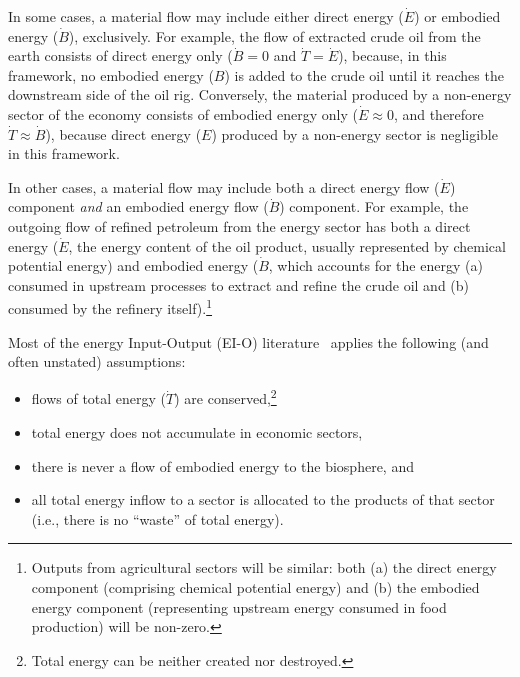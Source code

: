 In some cases, a material flow may include 
either direct energy ($\dot{E}$) 
or embodied energy ($\dot{B}$), exclusively. 
For example, the flow of extracted crude oil from the earth 
consists of direct energy only ($\dot{B} = 0$ and $\dot{T} = \dot{E}$), 
because, in this framework, no embodied energy ($B$) is added 
to the crude oil until it reaches the downstream side of the oil rig.
Conversely, the material produced by a non-energy sector of the economy 
consists of embodied energy only ($\dot{E} \approx 0$, 
and therefore $\dot{T} \approx \dot{B}$), 
because direct energy ($E$) produced by 
a non-energy sector is negligible in this framework. 

In other cases, a material flow may include both a direct energy flow
($\dot{E}$) component \emph{and} an embodied energy flow ($\dot{B}$) component.
For example, the outgoing flow of refined petroleum from the energy sector 
has both a direct energy ($\dot{E}$, the energy content of the oil product, 
usually represented by chemical potential energy) 
and embodied energy ($\dot{B}$, which accounts for the energy 
(a) consumed in upstream processes 
to extract and refine the crude oil and 
(b) consumed by the refinery itself).\footnote{Outputs from 
	agricultural sectors will be similar: 
	both (a) the direct energy component (comprising chemical potential energy) 
	and (b) the embodied energy component (representing upstream
	energy consumed in food production) will be non-zero.}

Most of the energy Input-Output (EI-O) literature~\cite{Bullard1975, Herendeen1978} 
applies the following (and often unstated) assumptions:

\begin{itemize}
	\item{flows of total energy ($\dot{T}$) are 
	conserved,\footnote{Total energy 
	can be neither created nor destroyed.}}

	\item{total energy does not accumulate in economic 
	sectors,}
	
	\item{there is never a flow of embodied energy to the biosphere, and}

	\item{all total energy inflow to a sector
	is allocated to the products of that sector (i.e., 
	there is no ``waste'' of total energy).}	
\end{itemize}

